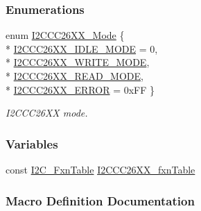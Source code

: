 \subsubsection*{Enumerations}
\begin{DoxyCompactItemize}
\item 
enum \hyperlink{_i2_c_c_c26_x_x_8h_a9deb519e150efd12ccf7068efca5ee75}{I2\+C\+C\+C26\+X\+X\+\_\+\+Mode} \{ \\*
\hyperlink{_i2_c_c_c26_x_x_8h_a9deb519e150efd12ccf7068efca5ee75a60d28fe92b8e810c3384ced9d3704b43}{I2\+C\+C\+C26\+X\+X\+\_\+\+I\+D\+L\+E\+\_\+\+M\+O\+D\+E} = 0, 
\\*
\hyperlink{_i2_c_c_c26_x_x_8h_a9deb519e150efd12ccf7068efca5ee75ace7a8aa7d1f988ee9f646dcf01b52c02}{I2\+C\+C\+C26\+X\+X\+\_\+\+W\+R\+I\+T\+E\+\_\+\+M\+O\+D\+E}, 
\\*
\hyperlink{_i2_c_c_c26_x_x_8h_a9deb519e150efd12ccf7068efca5ee75af55098f438a76add23448ed7e00babed}{I2\+C\+C\+C26\+X\+X\+\_\+\+R\+E\+A\+D\+\_\+\+M\+O\+D\+E}, 
\\*
\hyperlink{_i2_c_c_c26_x_x_8h_a9deb519e150efd12ccf7068efca5ee75a2c1e95ab5805dc5184f10f4a01e0e39c}{I2\+C\+C\+C26\+X\+X\+\_\+\+E\+R\+R\+O\+R} = 0x\+F\+F
 \}
\begin{DoxyCompactList}\small\item\em I2\+C\+C\+C26\+X\+X mode. \end{DoxyCompactList}\end{DoxyCompactItemize}
\subsubsection*{Variables}
\begin{DoxyCompactItemize}
\item 
const \hyperlink{struct_i2_c___fxn_table}{I2\+C\+\_\+\+Fxn\+Table} \hyperlink{_i2_c_c_c26_x_x_8h_a6fb66ad0052e9ab9d1c1b65b8276fc61}{I2\+C\+C\+C26\+X\+X\+\_\+fxn\+Table}
\end{DoxyCompactItemize}


\subsubsection{Macro Definition Documentation}
